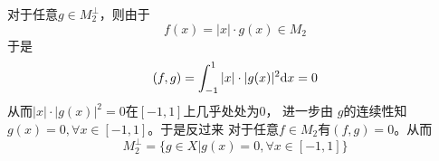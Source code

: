 \documentclass[cn]{homework}
\begin{document}
    对于任意$g\in M_2^\perp$，则由于
    \[f(x)=|x|\cdot g(x)\in M_2\]
    于是
    \[(f,g)=\int_{-1}^1|x|\cdot|g(x)|^2\mathrm d x=0\]
    从而$|x|\cdot |g(x)|^2=0$在$[-1,1]$上几乎处处为$0$，
    进一步由
    $g$的连续性知$g(x)=0,\forall x\in[-1,1]$。于是反过来
    对于任意$f\in M_2$有$(f,g)=0$。从而
    \[M_2^\perp=\{g\in X|g(x)=0,\forall x\in[-1,1]\}\]
\end{document}
